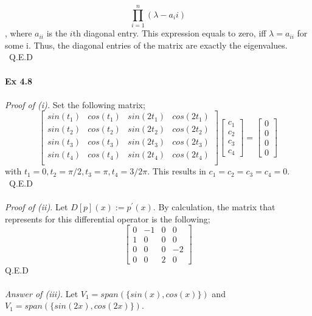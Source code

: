 \documentclass[letterpaper,12pt]{article}
\theoremstyle{definition}
\begin{document}
\begin{spacing}{1.3}{}
\[\prod_{i=1}^{n}(\lambda - a_ii)\]
, where $a_{ii}$ is the $i$th diagonal entry. This expression equals to zero, iff $\lambda = a_{ii}$ for some i. Thus, the diagonal entries of the matrix are exactly the eigenvalues. \ Q.E.D \\\\
\textbf{Ex 4.8} \\\\
\emph{Proof of (i). } Set the following matrix;
\[\begin{bmatrix}
    sin(t_1) & cos(t_1) & sin(2t_1) & cos(2t_1) \\
    sin(t_2) & cos(t_2) & sin(2t_2) & cos(2t_2) \\
    sin(t_3) & cos(t_3) & sin(2t_3) & cos(2t_3) \\
    sin(t_4) & cos(t_4) & sin(2t_4) & cos(2t_4) \\
  \end{bmatrix}  \begin{bmatrix}
                   c_1 \\
                   c_2 \\
                   c_3 \\
                   c_4
                 \end{bmatrix}  = \begin{bmatrix}
                                    0 \\
                                    0 \\
                                    0 \\
                                    0
                                  \end{bmatrix}\]
with $t_1 = 0, t_2 = \pi /2, t_3 = \pi, t_4 = 3/2 \pi$. This results in $c_1=c_2=c_3=c_4=0$. \ Q.E.D \\\\
\emph{Proof of (ii).} Let $D[p](x) := p^{'}(x)$. By calculation, the matrix that represents for this differential operator is the following;
\[ \begin{bmatrix}
     0 & -1 & 0 & 0 \\
     1 & 0 & 0 & 0 \\
     0 & 0 & 0 & -2 \\
     0 & 0 & 2 & 0
   \end{bmatrix}\]
Q.E.D \\\\
\emph{Answer of (iii). }
Let $V_1 = span(\{sin(x), cos(x)\})$ and $V_1 = span(\{sin(2x), cos(2x)\})$. \\\\


\end{spacing}
\end{document}
